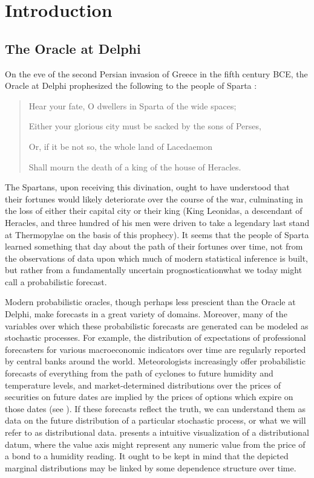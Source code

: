 
\chapter{Introduction}

\label{chap:Introduction}


\section{The Oracle at Delphi}

On the eve of the second Persian invasion of Greece in the fifth century
BCE, the Oracle at Delphi prophesized the following to the people
of Sparta \citep{macauley}:

\begingroup     \fontsize{10pt}{12pt}\selectfont
\begin{quotation}
Hear your fate, O dwellers in Sparta of the wide spaces;

Either your glorious city must be sacked by the sons of Perses, 

Or, if it be not so, the whole land of Lacedaemon

Shall mourn the death of a king of the house of Heracles.
\end{quotation}
\endgroup

The Spartans, upon receiving this divination, ought to have understood
that their fortunes would likely deteriorate over the course of the
war, culminating in the loss of either their capital city or their
king (King Leonidas, a descendant of Heracles, and three hundred of
his men were driven to take a legendary last stand at Thermopylae
on the basis of this prophecy). It seems that the people of Sparta
learned something that day about the path of their fortunes over time,
not from the observations of data upon which much of modern statistical
inference is built, but rather from a fundamentally uncertain prognostication\textemdash what
we today might call a probabilistic forecast.

Modern probabilistic oracles, though perhaps less prescient than the
Oracle at Delphi, make forecasts in a great variety of domains. Moreover,
many of the variables over which these probabilistic forecasts are
generated can be modeled as stochastic processes. For example, the
distribution of expectations of professional forecasters for various
macroeconomic indicators over time are regularly reported by central
banks around the world. Meteorologists increasingly offer probabilistic
forecasts of everything from the path of cyclones to future humidity
and temperature levels, and market-determined distributions over the
prices of securities on future dates are implied by the prices of
options which expire on those dates (see \citet[Section II in][]{breeden-litzenberger-1978}).
If these forecasts reflect the truth, we can understand them as data
on the future distribution of a particular stochastic process, or
what we will refer to as distributional data. 
presents a intuitive visualization of a distributional datum, where
the value axis might represent any numeric value from the price of
a bond to a humidity reading. It ought to be kept in mind that the
depicted marginal distributions may be linked by some dependence structure
over time.

